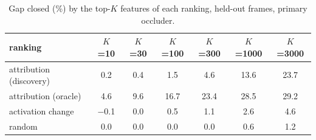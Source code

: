 \begin{table}[h]
\centering\small
\caption{Gap closed (\%) by the top-$K$ features of each ranking, held-out frames, primary occluder.}
\label{tab:kcurve}
\begin{tabular}{lcccccc}
\toprule
ranking & $K$=10 & $K$=30 & $K$=100 & $K$=300 & $K$=1000 & $K$=3000 \\
\midrule
attribution (discovery) & 0.2 & 0.4 & 1.5 & 4.6 & 13.6 & 23.7 \\
attribution (oracle) & 4.6 & 9.6 & 16.7 & 23.4 & 28.5 & 29.2 \\
activation change & $-$0.1 & 0.0 & 0.5 & 1.1 & 2.6 & 4.6 \\
random & 0.0 & 0.0 & 0.0 & 0.0 & 0.6 & 1.2 \\
\bottomrule
\end{tabular}
\end{table}
